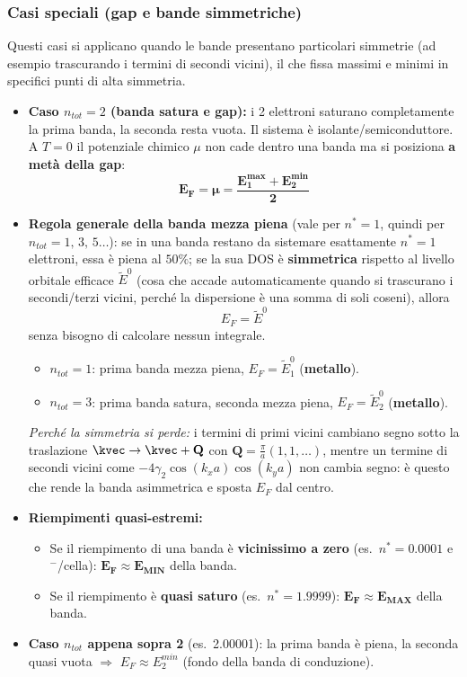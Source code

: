 \subsubsection*{Casi speciali (gap e bande simmetriche)}
Questi casi si applicano quando le bande presentano particolari simmetrie (ad esempio trascurando i termini di secondi vicini), il che fissa massimi e minimi in specifici punti di alta simmetria.
\begin{itemize}
    \item \textbf{Caso $n_{tot}=2$ (banda satura e gap):} i 2 elettroni saturano completamente la prima banda, la seconda resta vuota. Il sistema è isolante/semiconduttore. A $T=0$ il potenziale chimico $\mu$ non cade dentro una banda ma si posiziona \textbf{a metà della gap}:
    \[ \bm{E_F = \mu = \frac{E_1^{max}+E_2^{min}}{2}} \]
    \item \textbf{Regola generale della banda mezza piena} (vale per $n^*=1$, quindi per $n_{tot}=1,\,3,\,5\dots$): se in una banda restano da sistemare esattamente $n^*=1$ elettroni, essa è piena al $50\%$; se la sua DOS è \textbf{simmetrica} rispetto al livello orbitale efficace $\tilde E^0$ (cosa che accade automaticamente quando si trascurano i secondi/terzi vicini, perché la dispersione è una somma di soli coseni), allora
    \[ \boxed{E_F = \tilde E^0} \]
    senza bisogno di calcolare nessun integrale.
    \begin{itemize}
      \item $n_{tot}=1$: prima banda mezza piena, $E_F=\tilde E_1^0$ (\textbf{metallo}).
      \item $n_{tot}=3$: prima banda satura, seconda mezza piena, $E_F=\tilde E_2^0$ (\textbf{metallo}).
    \end{itemize}
    \textit{Perché la simmetria si perde:} i termini di primi vicini cambiano segno sotto la traslazione $\kvec\to\kvec+\mathbf{Q}$ con $\mathbf{Q}=\frac{\pi}{a}(1,1,\dots)$, mentre un termine di secondi vicini come $-4\gamma_2\cos(k_xa)\cos(k_ya)$ non cambia segno: è questo che rende la banda asimmetrica e sposta $E_F$ dal centro.
    \item \textbf{Riempimenti quasi-estremi:}
    \begin{itemize}
        \item Se il riempimento di una banda è \textbf{vicinissimo a zero} (es.\ $n^*=0.0001$ e$^-$/cella): $\bm{E_F\approx E_{MIN}}$ della banda.
        \item Se il riempimento è \textbf{quasi saturo} (es.\ $n^*=1.9999$): $\bm{E_F\approx E_{MAX}}$ della banda.
    \end{itemize}
    \item \textbf{Caso $n_{tot}$ appena sopra 2} (es.\ 2.00001): la prima banda è piena, la seconda quasi vuota $\Rightarrow$ $E_F \approx E_2^{min}$ (fondo della banda di conduzione).
\end{itemize}

